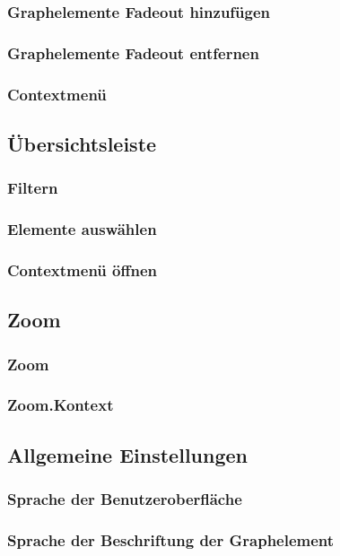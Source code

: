 \documentclass[enabledeprecatedfontcommands,fontsize=11pt,paper=a4,twoside]{scrartcl}
\begin{document}
		\subsubsection{Graphelemente Fadeout hinzufügen}
		\subsubsection{Graphelemente Fadeout entfernen}
		
		\subsubsection{Contextmenü}
	
	\subsection{Übersichtsleiste} \label{overwiew}
		\subsubsection{Filtern}
		\subsubsection{Elemente auswählen}
		\subsubsection{Contextmenü öffnen}
		
	\subsection{Zoom} \label{zoom}
		\subsubsection{Zoom}
		\subsubsection{Zoom.Kontext}
	\subsection{Allgemeine Einstellungen} \label{settings}
		\subsubsection{Sprache der Benutzeroberfläche}
		\subsubsection{Sprache der Beschriftung der Graphelement}
\end{document}
